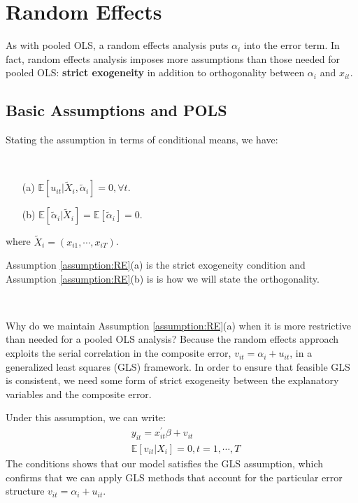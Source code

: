 \section{Random Effects}

As with pooled OLS, a random effects analysis puts $\alpha_i$ into the error term.
In fact, random effects analysis imposes more assumptions than those needed for pooled OLS:
\textbf{strict exogeneity} in addition to orthogonality between $\alpha_i$ and $x_{it}$. 

\subsection{Basic Assumptions and POLS}

Stating the assumption in terms of conditional means, we have:
\begin{assumption}\label{assumption:RE}
    \

    \begin{enumerate}
        \item[(a)] $\mathbb{E}[u_{it} | \tilde{X}_i, \tilde{\alpha}_i] = 0, \forall t.$
        \item[(b)] $\mathbb{E}[\tilde{\alpha}_i | \tilde{X}_i] = \mathbb{E}[\tilde{\alpha}_i] = 0.$
    \end{enumerate}
    where $\tilde{X}_i = (x_{i1}, \cdots, x_{iT})$.
\end{assumption}
Assumption \ref{assumption:RE}(a) is the strict exogeneity condition and Assumption \ref{assumption:RE}(b) is is how we will state the orthogonality.

\begin{remark}
    \

    Why do we maintain Assumption \ref{assumption:RE}(a) when it is more restrictive than needed for
    a pooled OLS analysis? Because the random effects approach exploits the serial correlation in
    the composite error, $v_{it} = \alpha_i + u_{it}$, in a generalized least squares (GLS) framework. In
    order to ensure that feasible GLS is consistent, we need some form of strict exogeneity between the explanatory variables and the composite error.

    Under this assumption, we can write:
    \begin{align*}
        & y_{it} = x_{it}^{\prime} \beta + v_{it} \\
        & \mathbb{E}[v_{it} | X_i] = 0, t=1, \cdots, T
    \end{align*}
    The conditions shows that our model satisfies the GLS assumption, which confirms that
    we can apply GLS methods that account for the particular error structure $v_{it} = \alpha_i + u_{it}.$
\end{remark}


